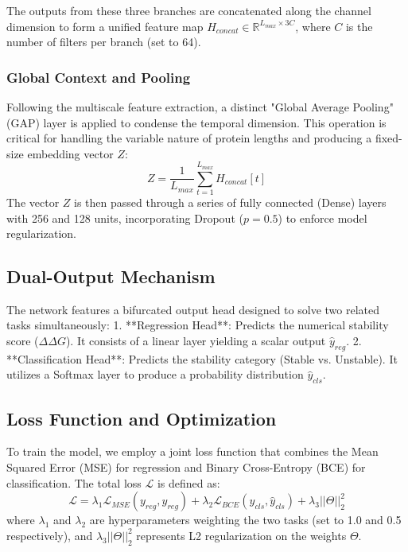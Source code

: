 \documentclass[conference]{IEEEtran}
\begin{document}
The outputs from these three branches are concatenated along the channel dimension to form a unified feature map $H_{concat} \in \mathbb{R}^{L_{max} \times 3C}$, where $C$ is the number of filters per branch (set to 64).

\subsubsection{Global Context and Pooling}
Following the multiscale feature extraction, a distinct "Global Average Pooling" (GAP) layer is applied to condense the temporal dimension. This operation is critical for handling the variable nature of protein lengths and producing a fixed-size embedding vector $Z$:
\begin{equation}
Z = \frac{1}{L_{max}} \sum_{t=1}^{L_{max}} H_{concat}[t]
\end{equation}
The vector $Z$ is then passed through a series of fully connected (Dense) layers with 256 and 128 units, incorporating Dropout ($p=0.5$) to enforce model regularization.

\subsection{Dual-Output Mechanism}
The network features a bifurcated output head designed to solve two related tasks simultaneously:
1.  **Regression Head**: Predicts the numerical stability score ($\Delta\Delta G$). It consists of a linear layer yielding a scalar output $\hat{y}_{reg}$.
2.  **Classification Head**: Predicts the stability category (Stable vs. Unstable). It utilizes a Softmax layer to produce a probability distribution $\hat{y}_{cls}$.

\subsection{Loss Function and Optimization}
To train the model, we employ a joint loss function that combines the Mean Squared Error (MSE) for regression and Binary Cross-Entropy (BCE) for classification. The total loss $\mathcal{L}$ is defined as:
\begin{equation}
\mathcal{L} = \lambda_1 \mathcal{L}_{MSE}(y_{reg}, \hat{y}_{reg}) + \lambda_2 \mathcal{L}_{BCE}(y_{cls}, \hat{y}_{cls}) + \lambda_3 ||\Theta||_2^2
\end{equation}
where $\lambda_1$ and $\lambda_2$ are hyperparameters weighting the two tasks (set to 1.0 and 0.5 respectively), and $\lambda_3 ||\Theta||_2^2$ represents L2 regularization on the weights $\Theta$.
\end{document}
